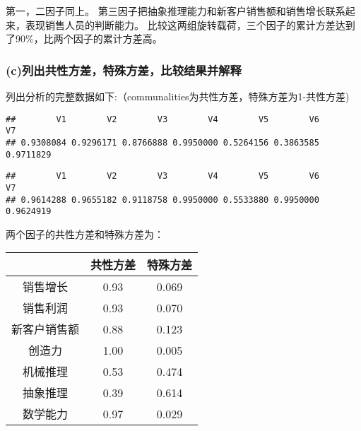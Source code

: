 \documentclass[
]{article}
\newenvironment{Shaded}{\begin{snugshade}}{\end{snugshade}}
\newcommand{\NormalTok}[1]{#1}
\newcommand{\OperatorTok}[1]{\textcolor[rgb]{0.81,0.36,0.00}{\textbf{#1}}}
\begin{document}
第一，二因子同上。
第三因子把抽象推理能力和新客户销售额和销售增长联系起来，表现销售人员的判断能力。
比较这两组旋转载荷，三个因子的累计方差达到了90\%，比两个因子的累计方差高。

\hypertarget{cux5217ux51faux5171ux6027ux65b9ux5deeux7279ux6b8aux65b9ux5deeux6bd4ux8f83ux7ed3ux679cux5e76ux89e3ux91ca}{%
\subsubsection{(c)列出共性方差，特殊方差，比较结果并解释}\label{cux5217ux51faux5171ux6027ux65b9ux5deeux7279ux6b8aux65b9ux5deeux6bd4ux8f83ux7ed3ux679cux5e76ux89e3ux91ca}}

列出分析的完整数据如下:（communalities为共性方差，特殊方差为1-共性方差)

\begin{Shaded}
\end{Shaded}

\begin{verbatim}
##        V1        V2        V3        V4        V5        V6        V7 
## 0.9308084 0.9296171 0.8766888 0.9950000 0.5264156 0.3863585 0.9711829
\end{verbatim}

\begin{Shaded}
\end{Shaded}

\begin{verbatim}
##        V1        V2        V3        V4        V5        V6        V7 
## 0.9614288 0.9655182 0.9118758 0.9950000 0.5533880 0.9950000 0.9624919
\end{verbatim}

两个因子的共性方差和特殊方差为：

\begin{longtable}[]{@{}ccc@{}}
\toprule
& 共性方差 & 特殊方差\tabularnewline
\midrule
\endhead
销售增长 & 0.93 & 0.069\tabularnewline
销售利润 & 0.93 & 0.070\tabularnewline
新客户销售额 & 0.88 & 0.123\tabularnewline
创造力 & 1.00 & 0.005\tabularnewline
机械推理 & 0.53 & 0.474\tabularnewline
抽象推理 & 0.39 & 0.614\tabularnewline
数学能力 & 0.97 & 0.029\tabularnewline
\bottomrule
\end{longtable}
\end{document}
